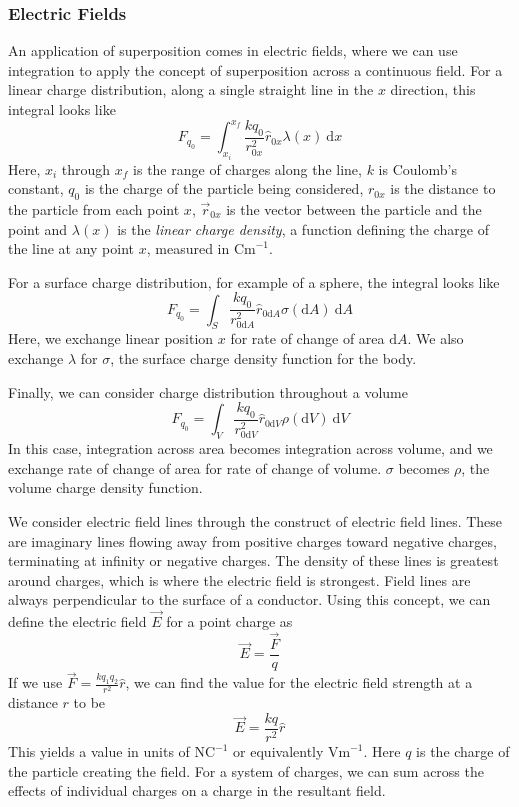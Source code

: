 \documentclass[12pt]{report}
\newcommand{\dx}{\:\mathrm{d}x}
\begin{document}
\begin{flushleft}
\subsubsection*{Electric Fields}
An application of superposition comes in electric fields, where we can use
integration to apply the concept of superposition across a continuous field.
For a linear charge distribution, along a single straight line in the \(x\) 
direction, this integral looks like  
\[F_{q_0} = \int_{x_i}^{x_f} \frac{kq_0}{r_{0x}^2}\hat{r}_{0x}\lambda(x)\dx\]
Here, \(x_i\) through \(x_f\) is the range of charges along the line, \(k\) is
Coulomb's constant, \(q_0\) is the charge of the particle being considered, 
\(r_{0x}\) is the distance to the particle from each point \(x\), 
\(\vec{r}_{0x}\) is the vector between the particle and the point and
\(\lambda(x)\) is the \textit{linear charge density}, a function defining the
charge of the line at any point \(x\), measured in \(\mathrm{Cm}^{-1}\). \par
For a surface charge distribution, for example of a sphere, the integral
looks like
\[F_{q_0} = \int_{S} \frac{kq_0}{r_{0\mathrm{d}A}^2}\hat{r}_{0\mathrm{d}A}
\sigma(\mathrm{d}A)\:\mathrm{d}A\]
Here, we exchange linear position \(x\) for rate of change of area 
\(\mathrm{d}A\). We also exchange \(\lambda\) for \(\sigma\), the surface
charge density function for the body. \par
Finally, we can consider charge distribution throughout a volume
\[F_{q_0} = \int_{V} \frac{kq_0}{r_{0\mathrm{d}V}^2}\hat{r}_{0\mathrm{d}V}
\rho(\mathrm{d}V)\:\mathrm{d}V\]
In this case, integration across area becomes integration across volume, and
we exchange rate of change of area for rate of change of volume. \(\sigma\)
becomes \(\rho\), the volume charge density function.

\bigskip
We consider electric field lines through the construct of electric field lines.
These are imaginary lines flowing away from positive charges toward negative
charges, terminating at infinity or negative charges. The density of these 
lines is greatest around charges, which is where the electric field is 
strongest. Field lines are always perpendicular to the surface of a conductor.
Using this concept, we can define the electric field \(\vec{E}\) for a point
charge as
\[\vec{E} = \frac{\vec{F}}{q}\]
If we use \(\vec{F} = \frac{kq_1q_2}{r^2}\hat{r}\), we can find the value for
the electric field strength at a distance \(r\) to be
\[\vec{E} = \frac{kq}{r^2}\hat{r}\]
This yields a value in units of \(\mathrm{NC}^{-1}\) or equivalently 
\(\mathrm{Vm}^{-1}\). Here \(q\) is the charge of the particle creating the 
field. For a system of charges, we can sum across the effects of individual
charges on a charge in the resultant field.


\end{flushleft}
\end{document}
